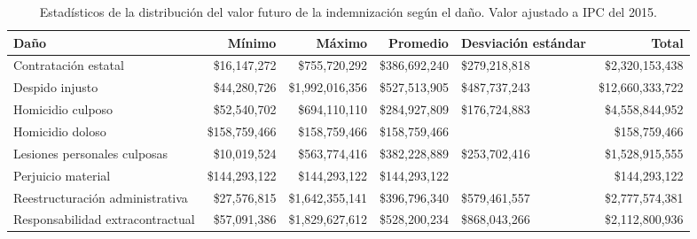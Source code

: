 \begin{sidewaystable}[htbp]
\centering
\caption{Estadísticos de la distribución del
valor futuro de la indemnización según el daño. Valor ajustado a IPC del 2015.} 
\label{tab:indemdano}
\begin{tabular}{lrrrR{2.5cm}r}
  \hline
Daño & Mínimo & Máximo & Promedio & Desviación estándar & Total \\ 
  \hline
Contratación estatal & \$16,147,272 & \$755,720,292 & \$386,692,240 & \$279,218,818 & \$2,320,153,438 \\ 
  Despido injusto & \$44,280,726 & \$1,992,016,356 & \$527,513,905 & \$487,737,243 & \$12,660,333,722 \\ 
  Homicidio culposo & \$52,540,702 & \$694,110,110 & \$284,927,809 & \$176,724,883 & \$4,558,844,952 \\ 
  Homicidio doloso & \$158,759,466 & \$158,759,466 & \$158,759,466 &  & \$158,759,466 \\ 
  Lesiones personales culposas & \$10,019,524 & \$563,774,416 & \$382,228,889 & \$253,702,416 & \$1,528,915,555 \\ 
  Perjuicio material & \$144,293,122 & \$144,293,122 & \$144,293,122 &  & \$144,293,122 \\ 
  Reestructuración administrativa & \$27,576,815 & \$1,642,355,141 & \$396,796,340 & \$579,461,557 & \$2,777,574,381 \\ 
  Responsabilidad extracontractual & \$57,091,386 & \$1,829,627,612 & \$528,200,234 & \$868,043,266 & \$2,112,800,936 \\ 
   \hline
\end{tabular}
\end{sidewaystable}
